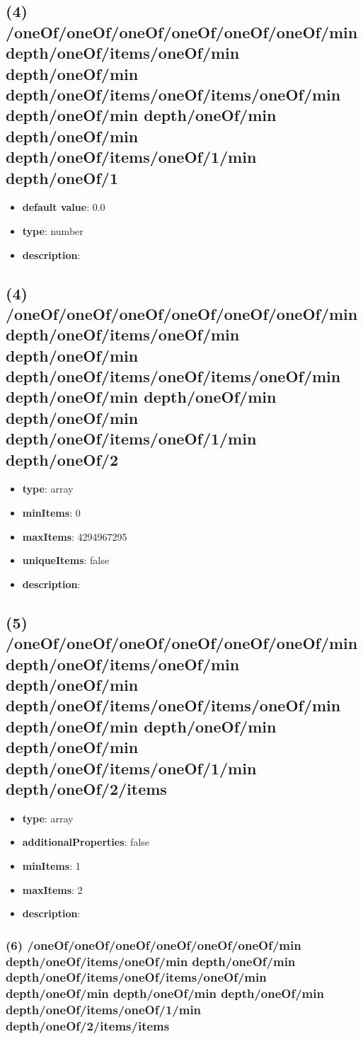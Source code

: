 \subsection{(4) /oneOf/oneOf/oneOf/oneOf/oneOf/oneOf/min depth/oneOf/items/oneOf/min depth/oneOf/min depth/oneOf/items/oneOf/items/oneOf/min depth/oneOf/min depth/oneOf/min depth/oneOf/min depth/oneOf/items/oneOf/1/min depth/oneOf/1}
\begin{itemize}[leftmargin=4em]\item {\bf default value}: 0.0
\item {\bf type}: number
\item {\bf description}: 
\end{itemize}\subsection{(4) /oneOf/oneOf/oneOf/oneOf/oneOf/oneOf/min depth/oneOf/items/oneOf/min depth/oneOf/min depth/oneOf/items/oneOf/items/oneOf/min depth/oneOf/min depth/oneOf/min depth/oneOf/min depth/oneOf/items/oneOf/1/min depth/oneOf/2}
\begin{itemize}[leftmargin=4em]\item {\bf type}: array
\item {\bf minItems}: 0
\item {\bf maxItems}: 4294967295
\item {\bf uniqueItems}: false
\item {\bf description}: 
\end{itemize}\subsection{(5) /oneOf/oneOf/oneOf/oneOf/oneOf/oneOf/min depth/oneOf/items/oneOf/min depth/oneOf/min depth/oneOf/items/oneOf/items/oneOf/min depth/oneOf/min depth/oneOf/min depth/oneOf/min depth/oneOf/items/oneOf/1/min depth/oneOf/2/items}
\begin{itemize}[leftmargin=5em]\item {\bf type}: array
\item {\bf additionalProperties}: false
\item {\bf minItems}: 1
\item {\bf maxItems}: 2
\item {\bf description}: 
\end{itemize}\subsubsection{(6) /oneOf/oneOf/oneOf/oneOf/oneOf/oneOf/min depth/oneOf/items/oneOf/min depth/oneOf/min depth/oneOf/items/oneOf/items/oneOf/min depth/oneOf/min depth/oneOf/min depth/oneOf/min depth/oneOf/items/oneOf/1/min depth/oneOf/2/items/items}

